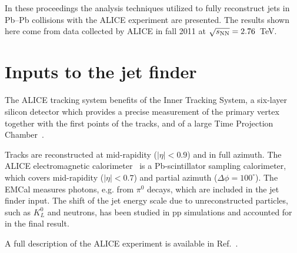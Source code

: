 \documentclass[a4paper]{jpconf}
\begin{document}
In these proceedings the analysis techniques utilized to fully reconstruct jets in Pb--Pb collisions with the 
ALICE experiment are presented. The results shown here come from data collected by ALICE in fall 2011 at $\sqrt{s_{\rm NN}}=2.76$~TeV.

\section{Inputs to the jet finder}
The ALICE tracking system benefits of
the Inner Tracking System, a six-layer silicon detector which provides a precise measurement 
of the primary vertex together with the first points 
of the tracks, and of a large Time Projection Chamber~\cite{alice-08}. 

Tracks are reconstructed at mid-rapidity ($|\eta|<0.9$) and in full azimuth.
The ALICE electromagnetic calorimeter~\cite{ppr-emcal} is a Pb-scintillator sampling calorimeter, which covers mid-rapidity
($|\eta|<0.7$) and partial azimuth ($\Delta\phi=100^{\circ}$). The EMCal measures photons, e.g. from $\pi^0$ decays, which are
included in the jet finder input.
The shift of the jet energy scale due to 
unreconstructed particles, such as $K^0_L$ and neutrons, has been studied in pp simulations and 
accounted for in the final result.

A full description of the ALICE experiment is available in Ref.~\cite{alice-08}.
\end{document}
